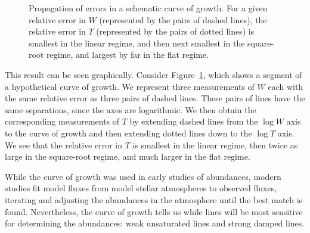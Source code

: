 \begin{figure}
\footnotesize
{}
\caption{Propagation of errors in a schematic curve of growth. For a given relative error in $W$ (represented by the pairs of dashed lines), the relative error in $T$ (represented by the pairs of dotted lines) is smallest in the linear regime, and then next smallest in the square-root regime, and largest by far in the flat regime.}
\label{figure:curve-of-growth-error}
\end{figure}

This result can be seen graphically. Consider Figure~\ref{figure:curve-of-growth-error}, which shows a segment of a hypothetical curve of growth. We represent three measurements of $W$ each with the same relative error as three pairs of dashed lines. These pairs of lines have the same separations, since the axes are logarithmic. We then obtain the corresponding measurements of $T$ by extending dashed lines from the $\log W$ axis to the curve of growth and then extending dotted lines down to the $\log T$ axis. We see that the relative error in $T$ is smallest in the linear regime, then twice as large in the square-root regime, and much larger in the flat regime.

While the curve of growth was used in early studies of abundances, modern studies fit model fluxes from model stellar atmospheres to observed fluxes, iterating and adjusting the abundances in the atmosphere until the best match is found. Nevertheless, the curve of growth tells us while lines will be most sensitive for determining the abundances: weak unsaturated lines and strong damped lines.

%


